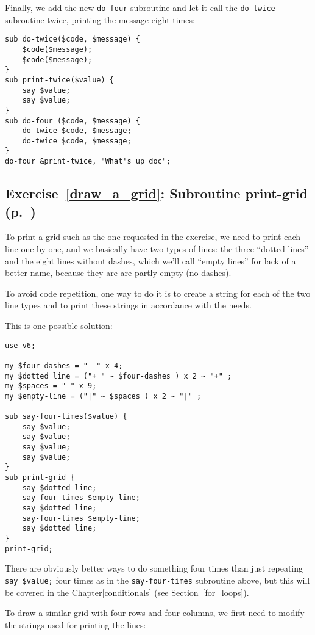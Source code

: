 Finally, we add the new {\tt do-four} subroutine and let 
it call the {\tt do-twice} subroutine twice, printing the 
message eight times:

\begin{verbatim}
sub do-twice($code, $message) {
    $code($message); 
    $code($message);
}
sub print-twice($value) {
    say $value;
    say $value;
}
sub do-four ($code, $message) {
    do-twice $code, $message;
    do-twice $code, $message;
}
do-four &print-twice, "What's up doc";
\end{verbatim}

\subsection{Exercise~\ref{draw_a_grid}: Subroutine print-grid 
(p.~\pageref{draw_a_grid})}
\label{sol_draw_a_grid}

To print a grid such as the one requested in the exercise, 
we need to print each line one by one, and we basically 
have two types of lines: the three ``dotted lines'' and 
the eight lines without dashes, which we'll call ``empty 
lines'' for lack of a better name, because they are are 
partly empty (no dashes).

To avoid code repetition, one way to do it is to create 
a string for each of the two line types and to print 
these strings in accordance with the needs.

This is one possible solution:

\begin{verbatim}
use v6;

my $four-dashes = "- " x 4;
my $dotted_line = ("+ " ~ $four-dashes ) x 2 ~ "+" ;
my $spaces = " " x 9;
my $empty-line = ("|" ~ $spaces ) x 2 ~ "|" ;

sub say-four-times($value) {
    say $value;
    say $value;
    say $value;
    say $value;
}
sub print-grid {
    say $dotted_line;
    say-four-times $empty-line;
    say $dotted_line;
    say-four-times $empty-line;
    say $dotted_line;
}
print-grid;
\end{verbatim}

There are obviously better ways to do something four times 
than just repeating \verb'say $value;' four times as in the 
{\tt say-four-times} subroutine above, but this will be covered in 
the Chapter\ref{conditionals} (see Section~\ref{for_loops}).

To draw a similar grid with four rows and four columns, we first 
need to modify the strings used for printing the lines:


